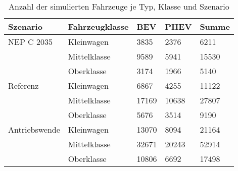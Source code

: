 {
\renewcommand{\arraystretch}{1.2}%
\begin{table}[H]
	\begin{center}
		\caption{Anzahl der simulierten Fahrzeuge je Typ, Klasse und Szenario}
		\begin{tabu} to \textwidth {X[1] X[1] X[1, r] X[1, r] X[1, r]}
			\hline
			Szenario         & Fahrzeugklasse & BEV         & PHEV        & Summe       \\ \hline
			NEP C \num{2035} & Kleinwagen     & \num{3835}  & \num{2376}  & \num{6211}  \\
							 & Mittelklasse   & \num{9589}  & \num{5941}  & \num{15530} \\
							 & Oberklasse     & \num{3174}  & \num{1966}  & \num{5140}  \\ \hline
			Referenz         & Kleinwagen     & \num{6867}  & \num{4255}  & \num{11122} \\
							 & Mittelklasse   & \num{17169} & \num{10638} & \num{27807} \\
							 & Oberklasse     & \num{5676}  & \num{3514}  & \num{9190}  \\ \hline
			Antriebswende    & Kleinwagen     & \num{13070} & \num{8094}  & \num{21164} \\
							 & Mittelklasse   & \num{32671} & \num{20243} & \num{52914} \\
							 & Oberklasse     & \num{10806} & \num{6692}  & \num{17498} \\ \hline
		\end{tabu}
		\label{tab:car_count_long}
	\end{center}
	\vspace{-3mm}%
\end{table}
}